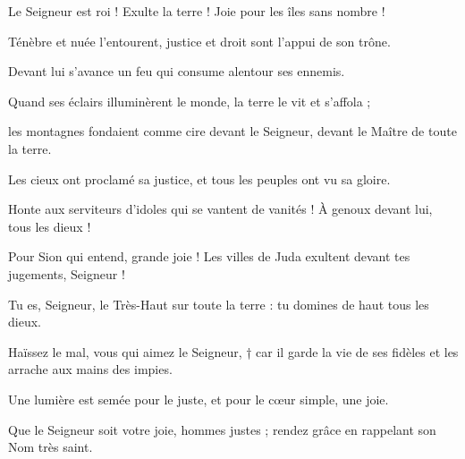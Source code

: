 \item Le Seigneur est roi ! Exulte la terre ! Joie pour les îles sans nombre !
\item Ténèbre et nuée l'entourent, justice et droit sont l'appui de son trône.
\item Devant lui s'avance un feu qui consume alentour ses ennemis.
\item Quand ses éclairs illuminèrent le monde, la terre le vit et s'affola ;
\item les montagnes fondaient comme cire devant le Seigneur, devant le Maître de toute la terre.
\item Les cieux ont proclamé sa justice, et tous les peuples ont vu sa gloire.
\item Honte aux serviteurs d'idoles qui se vantent de vanités ! À genoux devant lui, tous les dieux !
\item Pour Sion qui entend, grande joie ! Les villes de Juda exultent devant tes jugements, Seigneur !
\item Tu es, Seigneur, le Très-Haut sur toute la terre : tu domines de haut tous les dieux.
\item Haïssez le mal, vous qui aimez le Seigneur, † car il garde la vie de ses fidèles et les arrache aux mains des impies.
\item Une lumière est semée pour le juste, et pour le cœur simple, une joie.
\item Que le Seigneur soit votre joie, hommes justes ; rendez grâce en rappelant son Nom très saint.
